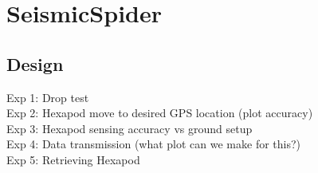 \section{SeismicSpider}\label{sec:SeismicSpider}

\subsection{Design}
Exp 1: Drop test\\
Exp 2: Hexapod move to desired GPS location  (plot accuracy)\\
Exp 3: Hexapod sensing accuracy vs ground setup\\
Exp 4: Data transmission (what plot can we make for this?)\\
Exp 5: Retrieving Hexapod\\